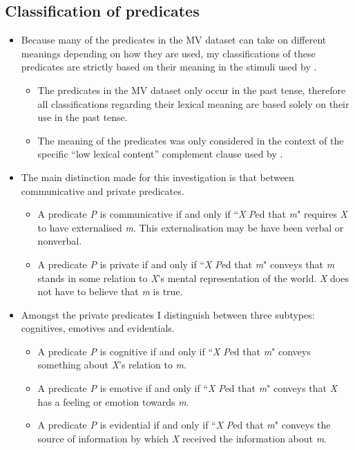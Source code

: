 \documentclass[11pt,fleqn]{article}
\newcommand{\6}{\mbox{$[\hspace*{-.6mm}[$}}
\newcommand{\9}{\mbox{$]\hspace*{-.6mm}]$}}
\begin{document}
\subsection{Classification of predicates}
\begin{itemize}
	\item Because many of the predicates in the MV dataset can take on different meanings depending on how they are used, my classifications of these predicates are strictly based on their meaning in the stimuli used by \cite{white-rawlins-nels2018}. 
	\begin{itemize}
		\item The predicates in the MV dataset only occur in the past tense, therefore all classifications regarding their lexical meaning are based solely on their use in the past tense. 
		\item The meaning of the predicates was only considered in the context of the specific “low lexical content” complement clause used by \cite{white-rawlins-nels2018}.	
	\end{itemize}
	\item The main distinction made for this investigation is that between communicative and private predicates.
	\begin{itemize}
		\item A predicate \emph{P} is communicative if and only if ``\emph{X} \emph{P}ed that \emph{m}" requires \emph{X} to have externalised \emph{m}. This externalisation may be have been verbal or nonverbal. 
		\item A predicate \emph{P} is private if and only if ``\emph{X} \emph{P}ed that \emph{m}" conveys that \emph{m} stands in some relation to \emph{X}'s mental representation of the world. \emph{X} does not have to believe that \emph{m} is true.
	\end{itemize}
	\item Amongst the private predicates I distinguish between three subtypes: cognitives, emotives and evidentials. 
	\begin{itemize}
		\item A predicate \emph{P} is cognitive if and only if ``\emph{X} \emph{P}ed that \emph{m}" conveys something about \emph{X}'s relation to \emph{m}.
		\item A predicate \emph{P} is emotive if and only if ``\emph{X} \emph{P}ed that \emph{m}" conveys that \emph{X} has a feeling or emotion towards \emph{m}. 
		\item A predicate \emph{P} is evidential if and only if ``\emph{X} \emph{P}ed that \emph{m}" conveys the source of information by which \emph{X} received the information about \emph{m}.

\end{itemize}
\end{itemize}
\end{document}
